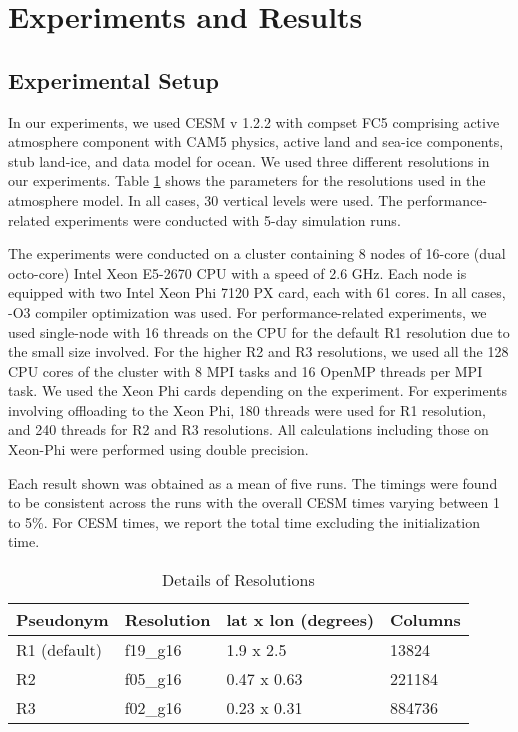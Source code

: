 \section{Experiments and Results}
\label{exp_res}

\subsection{Experimental Setup}

In our experiments, we used CESM v 1.2.2 with compset FC5 comprising active atmosphere component with CAM5 physics, active land and sea-ice components, stub land-ice, and data model for ocean. We used three different resolutions in our experiments. Table \ref{resolutions} shows the parameters for the resolutions used in the atmosphere model. In all cases, 30 vertical levels were used.  The performance-related experiments were conducted with 5-day simulation runs.

The experiments were conducted on a cluster containing 8 nodes of 16-core (dual octo-core) Intel Xeon E5-2670 CPU with a speed of 2.6 GHz. Each node is equipped with two Intel Xeon Phi 7120 PX card, each with 61 cores.  In all cases, -O3 compiler optimization was used. For performance-related experiments, we used single-node with 16 threads on the CPU for the default R1 resolution due to the small size involved. For the higher R2 and R3 resolutions, we used all the 128 CPU cores of the cluster with 8 MPI tasks and 16 OpenMP threads per MPI task. We used the Xeon Phi cards depending on the experiment. For experiments involving offloading to the Xeon Phi, 180 threads were used for R1 resolution, and 240 threads for R2 and R3 resolutions. All calculations including those on Xeon-Phi were performed using double precision.

Each result shown was obtained as a mean of five runs. The timings were found to be consistent across the runs with the overall CESM times varying between 1 to 5\%. For CESM times, we report the total time excluding the initialization time.

\begin{table}
 \small
 \centering
 \begin{tabular}{||p{0.65in}|p{0.5in}|p{0.9in}|p{0.4in}||}
  \hline\hline
Pseudonym & Resolution & lat x lon (degrees) & Columns \\
  \hline\hline
R1 (default) & f19\_g16 & 1.9 x 2.5 & 13824 \\ \hline
R2 & f05\_g16 & 0.47 x 0.63 & 221184 \\ \hline
R3 & f02\_g16 & 0.23 x 0.31 & 884736 \\
  \hline\hline
 \end{tabular}
\caption{Details of Resolutions}
\label{resolutions}
\end{table}

